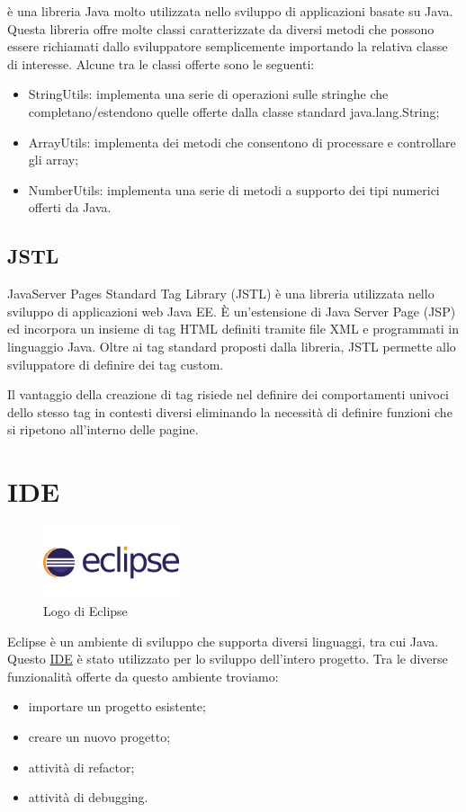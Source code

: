 \ap{{[b]}} è una libreria Java molto utilizzata nello sviluppo di applicazioni basate su Java. Questa libreria offre molte classi caratterizzate da diversi metodi che possono essere richiamati dallo sviluppatore semplicemente importando la relativa classe di interesse. Alcune tra le classi offerte sono le seguenti:
\begin{itemize}
\item StringUtils: implementa una serie di operazioni sulle stringhe che completano/estendono quelle offerte dalla classe standard java.lang.String;
\item ArrayUtils: implementa dei metodi che consentono di processare e controllare gli array; 
\item NumberUtils: implementa una serie di metodi a supporto dei tipi numerici offerti da Java.
\end{itemize} 

\subsection{JSTL}
\noindent JavaServer Pages Standard Tag Library (JSTL) è una libreria utilizzata nello sviluppo di applicazioni web Java EE. È un'estensione di Java Server Page (JSP) ed incorpora un insieme di tag HTML definiti tramite file XML e programmati in linguaggio Java. Oltre ai tag standard proposti dalla libreria, JSTL permette allo sviluppatore di definire dei tag custom. 

\setlength{\parskip}{3ex}

\noindent Il vantaggio della creazione di tag risiede nel definire dei comportamenti univoci dello stesso tag in contesti diversi eliminando la necessità di definire funzioni che si ripetono all'interno delle pagine.

\pagebreak

\section{IDE}

\begin{figure}[!h]
	\centering
	\includegraphics[width=4cm]{../images/Eclipse-logo.png}
	\caption{Logo di Eclipse}
\end{figure}

\noindent Eclipse è un ambiente di sviluppo che supporta diversi linguaggi, tra cui Java. Questo {\hyperref[para:ide-definition]{IDE}}\glsfirstoccur \; è stato utilizzato per lo sviluppo dell'intero progetto.
Tra le diverse funzionalità offerte da questo ambiente troviamo:
\begin{itemize}
\item importare un progetto esistente;
\item creare un nuovo progetto;
\item attività di refactor;
\item attività di debugging.
\end{itemize}